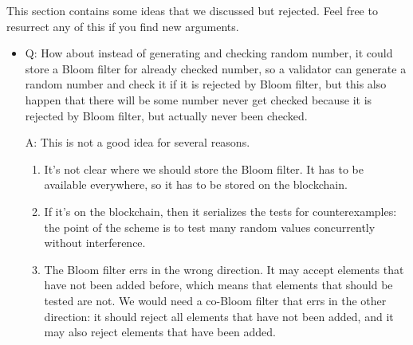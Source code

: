 \documentclass{article}
\begin{document}
This section contains some ideas that we discussed but rejected. Feel free to resurrect
any of this if you find new arguments.

\begin{itemize}
\item Q: How about instead of generating and checking random number, it could
  store a Bloom filter for already checked number, so a validator can
  generate a random number and check it if it is rejected by Bloom filter,
  but this also happen that there will be some number never get checked
  because it is rejected by Bloom filter, but actually never been checked.

  A: This is not a good idea for several reasons.
  \begin{enumerate}
  \item It's not clear where we should store the Bloom filter. It has to be available
    everywhere, so it has to be stored on the blockchain.
  \item If it's on the blockchain, then it serializes the tests for counterexamples:
    the point of the scheme is to test many random values concurrently without
    interference.
  \item The Bloom filter errs in the wrong direction. It may accept elements that have
    not been added before, which means that elements that should be tested are not. We
    would need a co-Bloom filter that errs in the other direction: it should reject all
    elements that have not been added, and it may also reject elements that have been added.
  \end{enumerate}

\end{itemize}
\end{document}
